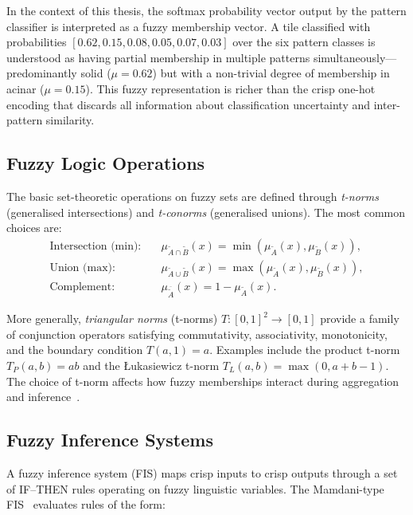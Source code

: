 In the context of this thesis, the softmax probability vector output by the pattern classifier is interpreted as a fuzzy membership vector.
A tile classified with probabilities $[0.62, 0.15, 0.08, 0.05, 0.07, 0.03]$ over the six pattern classes is understood as having partial membership in multiple patterns simultaneously---predominantly solid ($\mu = 0.62$) but with a non-trivial degree of membership in acinar ($\mu = 0.15$).
This fuzzy representation is richer than the crisp one-hot encoding that discards all information about classification uncertainty and inter-pattern similarity.

\subsection{Fuzzy Logic Operations}
\label{sec:bg:fuzzy:operations}

The basic set-theoretic operations on fuzzy sets are defined through \emph{t-norms} (generalised intersections) and \emph{t-conorms} (generalised unions).
The most common choices are:
\begin{align}
    \text{Intersection (min):} \quad & \mu_{\tilde{A} \cap \tilde{B}}(x) = \min(\mu_{\tilde{A}}(x), \mu_{\tilde{B}}(x)), \label{eq:fuzzy_intersection}\\
    \text{Union (max):} \quad & \mu_{\tilde{A} \cup \tilde{B}}(x) = \max(\mu_{\tilde{A}}(x), \mu_{\tilde{B}}(x)), \label{eq:fuzzy_union}\\
    \text{Complement:} \quad & \mu_{\overline{\tilde{A}}}(x) = 1 - \mu_{\tilde{A}}(x). \label{eq:fuzzy_complement}
\end{align}

More generally, \emph{triangular norms} (t-norms) $T: [0,1]^2 \to [0,1]$ provide a family of conjunction operators satisfying commutativity, associativity, monotonicity, and the boundary condition $T(a, 1) = a$.
Examples include the product t-norm $T_P(a, b) = ab$ and the {\L}ukasiewicz t-norm $T_L(a, b) = \max(0, a + b - 1)$.
The choice of t-norm affects how fuzzy memberships interact during aggregation and inference~\cite{grabisch2009aggregation}.

\subsection{Fuzzy Inference Systems}
\label{sec:bg:fuzzy:inference}

A fuzzy inference system (FIS) maps crisp inputs to crisp outputs through a set of IF--THEN rules operating on fuzzy linguistic variables.
The Mamdani-type FIS~\cite{mamdani1975experiment} evaluates rules of the form:

